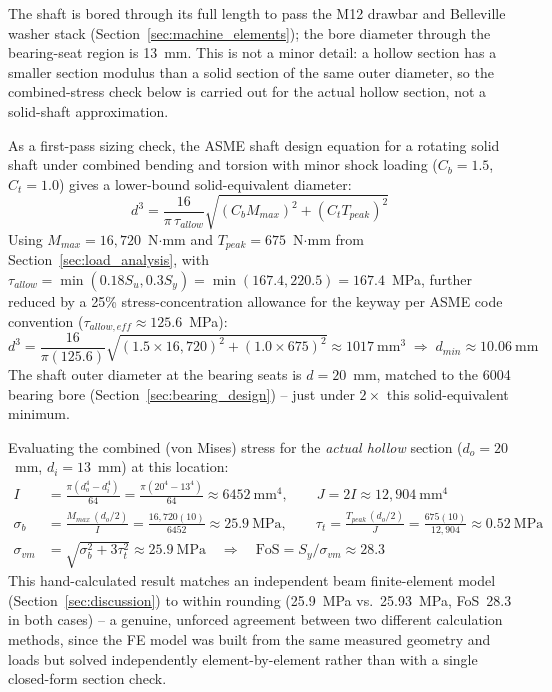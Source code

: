\documentclass[12pt,a4paper]{report}
\begin{document}
	The shaft is bored through its full length to pass the M12 drawbar and Belleville washer
	stack (Section~\ref{sec:machine_elements}); the bore diameter through the bearing-seat region
	is 13~mm. This is not a minor detail: a hollow section has a smaller section modulus than a
	solid section of the same outer diameter, so the combined-stress check below is carried out
	for the actual hollow section, not a solid-shaft approximation.
	
	As a first-pass sizing check, the ASME shaft design equation for a rotating solid shaft under
	combined bending and torsion with minor shock loading ($C_b = 1.5$, $C_t = 1.0$) \cite{ref1}
	gives a lower-bound solid-equivalent diameter:
	\begin{equation}
		d^3 = \frac{16}{\pi\,\tau_{allow}}\sqrt{(C_b M_{max})^2 + (C_t T_{peak})^2}
	\end{equation}
	Using $M_{max} = 16{,}720$~N$\cdot$mm and $T_{peak} = 675$~N$\cdot$mm from Section~\ref{sec:load_analysis}, with
	$\tau_{allow} = \min(0.18S_u, 0.3S_y) = \min(167.4, 220.5) = 167.4$~MPa, further reduced
	by a 25\% stress-concentration allowance for the keyway per ASME code convention
	($\tau_{allow,eff} \approx 125.6$~MPa):
	\begin{equation}
		d^3 = \frac{16}{\pi(125.6)}\sqrt{(1.5\times16{,}720)^2 + (1.0\times675)^2} \approx 1017~\text{mm}^3
		\;\Rightarrow\; d_{min} \approx 10.06~\text{mm}
	\end{equation}
	The shaft outer diameter at the bearing seats is $d=20$~mm, matched to the 6004 bearing bore
	(Section~\ref{sec:bearing_design}) -- just under $2\times$ this solid-equivalent minimum.
	
	Evaluating the combined (von Mises) stress for the \emph{actual hollow} section
	($d_o=20$~mm, $d_i=13$~mm) at this location:
	\begin{align}
		I &= \frac{\pi(d_o^4-d_i^4)}{64} = \frac{\pi(20^4-13^4)}{64} \approx 6452~\text{mm}^4, \qquad
		J = 2I \approx 12{,}904~\text{mm}^4 \\
		\sigma_b &= \frac{M_{max}\,(d_o/2)}{I} = \frac{16{,}720(10)}{6452} \approx 25.9~\text{MPa}, \qquad
		\tau_t = \frac{T_{peak}\,(d_o/2)}{J} = \frac{675(10)}{12{,}904} \approx 0.52~\text{MPa} \\
		\sigma_{vm} &= \sqrt{\sigma_b^2 + 3\tau_t^2} \approx 25.9~\text{MPa} \quad\Rightarrow\quad \text{FoS} = S_y/\sigma_{vm} \approx 28.3
	\end{align}
	This hand-calculated result matches an independent beam finite-element model
	(Section~\ref{sec:discussion}) to within rounding (25.9~MPa vs.\ 25.93~MPa, FoS~28.3 in both
	cases) -- a genuine, unforced agreement between two different calculation methods, since the
	FE model was built from the same measured geometry and loads but solved independently
	element-by-element rather than with a single closed-form section check.
	
\end{document}
